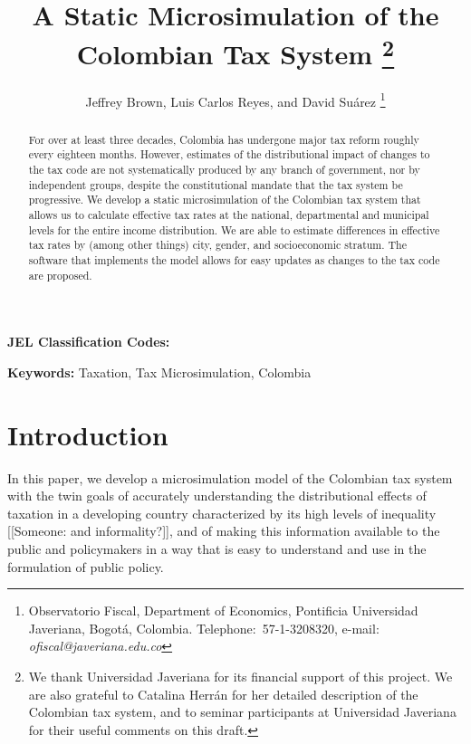 \documentclass[12pt]{article}
\begin{document}
\title{A Static Microsimulation of the Colombian Tax System
  \thanks{We thank Universidad Javeriana for its financial support of this project.
    We are also grateful to Catalina Herr\'{a}n for her detailed description of the Colombian tax system,
    and to seminar participants at Universidad Javeriana for their useful comments on this draft.}}
\author{Jeffrey Brown, Luis Carlos Reyes, and David Su\'{a}rez
  \thanks{Observatorio Fiscal,
    Department of Economics, Pontificia Universidad Javeriana, Bogot\'{a}, Colombia.
    Telephone:\ 57-1-3208320,
    e-mail: \textit{ofiscal@javeriana.edu.co}}}

\maketitle
\begin{abstract}
  For over at least three decades,
  Colombia has undergone major tax reform roughly every eighteen months.
  However, estimates of the distributional impact of changes to the tax code are not systematically produced by any branch of government,
  nor by independent groups,
  despite the constitutional mandate that the tax system be progressive.
  We develop a static microsimulation of the Colombian tax system
  that allows us to calculate effective tax rates
  at the national, departmental and municipal levels
  for the entire income distribution.
  We are able to estimate differences in effective tax rates by
  (among other things) city, gender, and socioeconomic stratum.
  The software that implements the model allows for
  easy updates as changes to the tax code are proposed.
 \end{abstract}

\textbf{JEL Classification Codes:}

\textbf{Keywords:} Taxation, Tax Microsimulation, Colombia
\pagebreak%
\doublespacing

\section{Introduction}

In this paper, we develop a microsimulation model of the Colombian tax system
with the twin goals of
accurately understanding the distributional effects of taxation
in a developing country characterized by its high levels of inequality
[[Someone:
    and informality?]],
and of making this information available to the public and policymakers
in a way that is easy to understand and use in the formulation of public policy.
\end{document}
